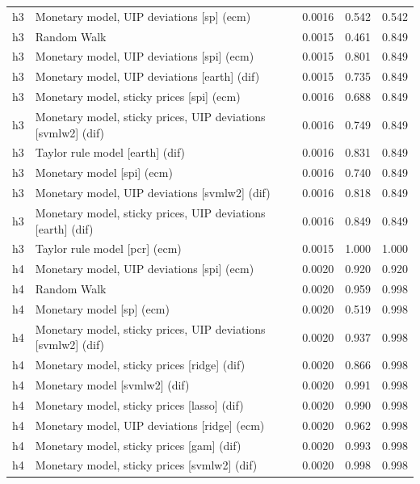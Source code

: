 \begin{ThreePartTable}
\begin{longtable}[t]{cp{5.5cm}ccc}
\addlinespace
h3 & \raggedright Monetary model, UIP deviations [sp] (ecm) & 0.0016 & 0.542 & 0.542\\
h3 & \raggedright Random Walk & 0.0015 & 0.461 & 0.849\\
h3 & \raggedright Monetary model, UIP deviations [spi] (ecm) & 0.0015 & 0.801 & 0.849\\
h3 & \raggedright Monetary model, UIP deviations [earth] (dif) & 0.0015 & 0.735 & 0.849\\
h3 & \raggedright Monetary model, sticky prices [spi] (ecm) & 0.0016 & 0.688 & 0.849\\
h3 & \raggedright Monetary model, sticky prices, UIP deviations [svmlw2] (dif) & 0.0016 & 0.749 & 0.849\\
h3 & \raggedright Taylor rule model [earth] (dif) & 0.0016 & 0.831 & 0.849\\
h3 & \raggedright Monetary model [spi] (ecm) & 0.0016 & 0.740 & 0.849\\
h3 & \raggedright Monetary model, UIP deviations [svmlw2] (dif) & 0.0016 & 0.818 & 0.849\\
h3 & \raggedright Monetary model, sticky prices, UIP deviations [earth] (dif) & 0.0016 & 0.849 & 0.849\\
h3 & \raggedright Taylor rule model [pcr] (ecm) & 0.0015 & 1.000 & 1.000\\
\addlinespace
h4 & \raggedright Monetary model, UIP deviations [spi] (ecm) & 0.0020 & 0.920 & 0.920\\
h4 & \raggedright Random Walk & 0.0020 & 0.959 & 0.998\\
h4 & \raggedright Monetary model [sp] (ecm) & 0.0020 & 0.519 & 0.998\\
h4 & \raggedright Monetary model, sticky prices, UIP deviations [svmlw2] (dif) & 0.0020 & 0.937 & 0.998\\
h4 & \raggedright Monetary model, sticky prices [ridge] (dif) & 0.0020 & 0.866 & 0.998\\
h4 & \raggedright Monetary model [svmlw2] (dif) & 0.0020 & 0.991 & 0.998\\
h4 & \raggedright Monetary model, sticky prices [lasso] (dif) & 0.0020 & 0.990 & 0.998\\
h4 & \raggedright Monetary model, UIP deviations [ridge] (ecm) & 0.0020 & 0.962 & 0.998\\
h4 & \raggedright Monetary model, sticky prices [gam] (dif) & 0.0020 & 0.993 & 0.998\\
h4 & \raggedright Monetary model, sticky prices [svmlw2] (dif) & 0.0020 & 0.998 & 0.998\\

\end{longtable}
\end{ThreePartTable}
